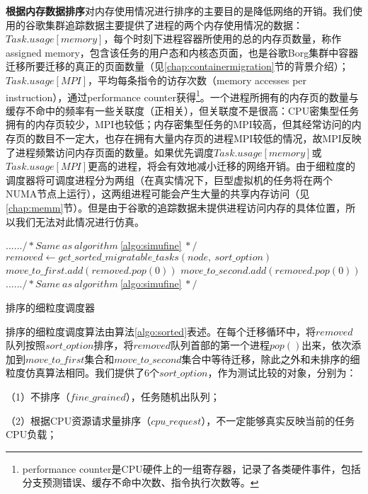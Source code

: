 \noindent\textbf{根据内存数据排序}\quad 对内存使用情况进行排序的主要目的是降低网络的开销。我们使用的谷歌集群追踪数据主要提供了进程的两个内存使用情况的数据：$Task.usage[memory]$，每个时刻下进程容器所使用的总的内存页数量，称作assigned memory，包含该任务的用户态和内核态页面，也是谷歌Borg集群中容器迁移所要迁移的真正的页面数量（见\ref{chap:containermigration}节的背景介绍）；$Task.usage[MPI]$，平均每条指令的访存次数（memory accesses per instruction），通过performance counter获得\footnote{performance counter\cite{perf}是CPU硬件上的一组寄存器，记录了各类硬件事件，包括分支预测错误、缓存不命中次数、指令执行次数等。}。一个进程所拥有的内存页的数量与缓存不命中的频率有一些关联度（正相关），但关联度不是很高：CPU密集型任务拥有的内存页较少，MPI也较低；内存密集型任务的MPI较高，但其经常访问的内存页的数目不一定大，也存在拥有大量内存页的进程MPI较低的情况，故MPI反映了进程频繁访问内存页面的数量。如果优先调度$Task.usage[memory]$或$Task.usage[MPI]$更高的进程，将会有效地减小迁移的网络开销。由于细粒度的调度器将可调度进程分为两组（在真实情况下，巨型虚拟机的任务将在两个NUMA节点上运行），这两组进程可能会产生大量的共享内存访问（见\ref{chap:memm}节）。但是由于谷歌的追踪数据未提供进程访问内存的具体位置，所以我们无法对此情况进行仿真。

\begin{algorithm}[h]
\begin{algorithmic}[1]
\State $...... /* Same \ as\  algorithm\ $\ref{algo:simufine}$\ */$
\State $removed \gets get\_sorted\_migratable\_tasks(node,\ sort\_option)$
\State $move\_to\_first.add(removed.pop(0))$
\EndWhile
{}
\State $move\_to\_second.add(removed.pop(0))$
\EndWhile
\State $...... /* Same \ as\  algorithm\ $\ref{algo:simufine}$\ */$
\EndFunction
\end{algorithmic}
\caption{排序的细粒度调度器}
\label{algo:sorted}
\end{algorithm}

排序的细粒度调度算法由算法\ref{algo:sorted}表述。在每个迁移循环中，将$removed$队列按照$sort\_option$排序，将$removed$队列首部的第一个进程$pop()$出来，依次添加到$move\_to\_first$集合和$move\_to\_second$集合中等待迁移，除此之外和未排序的细粒度仿真算法相同。我们提供了6个$sort\_option$，作为测试比较的对象，分别为：

（1）不排序（$fine\_grained$），任务随机出队列；

（2）根据CPU资源请求量排序（$cpu\_request$），不一定能够真实反映当前的任务CPU负载；

